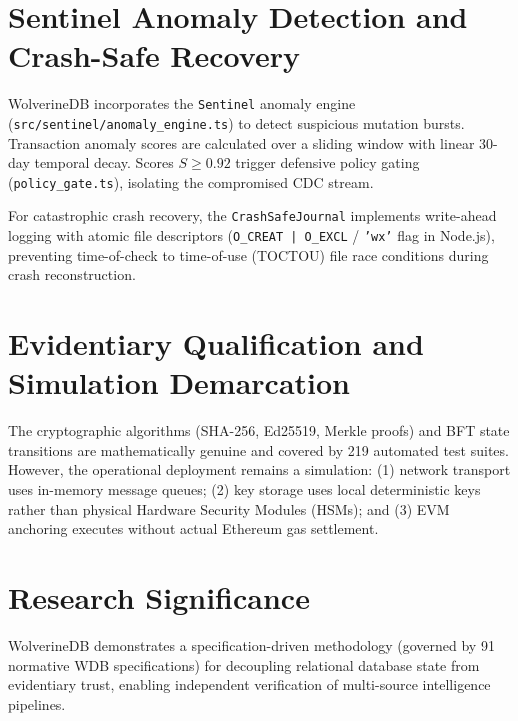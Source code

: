 \section{Sentinel Anomaly Detection and Crash-Safe Recovery}
\label{sec:sentinel_recovery}

WolverineDB incorporates the \texttt{Sentinel} anomaly engine (\texttt{src/sentinel/anomaly\_engine.ts}) to detect suspicious mutation bursts. Transaction anomaly scores are calculated over a sliding window with linear 30-day temporal decay. Scores $S \ge 0.92$ trigger defensive policy gating (\texttt{policy\_gate.ts}), isolating the compromised CDC stream.

For catastrophic crash recovery, the \texttt{CrashSafeJournal} implements write-ahead logging with atomic file descriptors (\texttt{O\_CREAT | O\_EXCL} / \texttt{'wx'} flag in Node.js), preventing time-of-check to time-of-use (TOCTOU) file race conditions during crash reconstruction.

\section{Evidentiary Qualification and Simulation Demarcation}
\label{sec:wdb_limitations}

The cryptographic algorithms (SHA-256, Ed25519, Merkle proofs) and BFT state transitions are mathematically genuine and covered by 219 automated test suites. However, the operational deployment remains a simulation: (1) network transport uses in-memory message queues; (2) key storage uses local deterministic keys rather than physical Hardware Security Modules (HSMs); and (3) EVM anchoring executes without actual Ethereum gas settlement.

\section{Research Significance}
\label{sec:wdb_significance}

WolverineDB demonstrates a specification-driven methodology (governed by 91 normative WDB specifications) for decoupling relational database state from evidentiary trust, enabling independent verification of multi-source intelligence pipelines.
